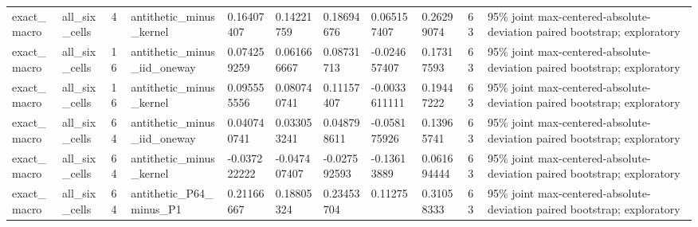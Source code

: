 \begin{tabular}{lllllllllll}
exact\_macro & all\_six\_cells & 4 & antithetic\_minus\_kernel & 0.16407407 & 0.14221759 & 0.18694676 & 0.065157407 & 0.26299074 & 63 & 95\% joint max-centered-absolute-deviation paired bootstrap; exploratory \\
exact\_macro & all\_six\_cells & 16 & antithetic\_minus\_iid\_oneway & 0.074259259 & 0.061666667 & 0.08731713 & -0.024657407 & 0.17317593 & 63 & 95\% joint max-centered-absolute-deviation paired bootstrap; exploratory \\
exact\_macro & all\_six\_cells & 16 & antithetic\_minus\_kernel & 0.095555556 & 0.080740741 & 0.11157407 & -0.0033611111 & 0.19447222 & 63 & 95\% joint max-centered-absolute-deviation paired bootstrap; exploratory \\
exact\_macro & all\_six\_cells & 64 & antithetic\_minus\_iid\_oneway & 0.040740741 & 0.033053241 & 0.048798611 & -0.058175926 & 0.13965741 & 63 & 95\% joint max-centered-absolute-deviation paired bootstrap; exploratory \\
exact\_macro & all\_six\_cells & 64 & antithetic\_minus\_kernel & -0.037222222 & -0.047407407 & -0.027592593 & -0.13613889 & 0.061694444 & 63 & 95\% joint max-centered-absolute-deviation paired bootstrap; exploratory \\
exact\_macro & all\_six\_cells & 64 & antithetic\_P64\_minus\_P1 & 0.21166667 & 0.18805324 & 0.23453704 & 0.11275 & 0.31058333 & 63 & 95\% joint max-centered-absolute-deviation paired bootstrap; exploratory \\
\bottomrule
\end{tabular}
